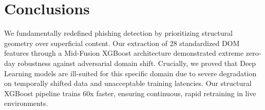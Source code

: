 \documentclass[conference]{IEEEtran}
\begin{document}
\section{Conclusions}
We fundamentally redefined phishing detection by prioritizing structural geometry over superficial content. Our extraction of 28 standardized DOM features through a Mid-Fusion XGBoost architecture demonstrated extreme zero-day robustness against adversarial domain shift. Crucially, we proved that Deep Learning models are ill-suited for this specific domain due to severe degradation on temporally shifted data and unacceptable training latencies. Our structural XGBoost pipeline trains 60x faster, ensuring continuous, rapid retraining in live environments.



\end{document}
